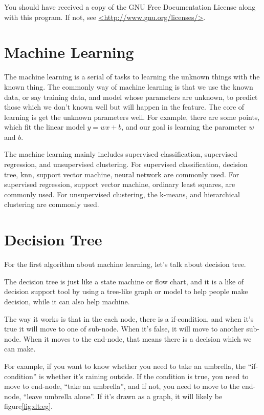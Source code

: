 \documentclass[twoside]{article}
\begin{document}
You should have received a copy of the GNU Free Documentation License
along with this program.  If not, see \href{http://www.gnu.org/licenses}{<http://www.gnu.org/licenses/>}.

\section{Machine Learning}
\label{sec:ml}

The machine learning is a serial of tasks to learning the unknown things with the known thing.
The commonly way of machine learning is that we use the known data, or say training data, and model whose parameters are unknown,
to predict those which we don't known well but will happen in the feature.  The core of learning is get the unknown parameters well.
For example, there are some points, which fit the linear model $y = wx+b$, and our goal is learning the parameter $w$ and $b$.

The machine learning mainly includes supervised classification, supervised regression, and unsupervised clustering.
For supervised classification, decision tree, knn, support vector machine, neural network are commonly used.
For supervised regression, support vector machine, ordinary least squares, are commonly used.
For unsupervised clustering, the k-means, and hierarchical clustering are commonly used.

\section{Decision Tree}
\label{sec:decisiontree}

For the first algorithm about machine learning, let's talk about decision tree.

The decision tree is just like a state machine or flow chart, and it is a like of decision support tool
by using a tree-like graph or model to help people make decision, while it can also help machine.

The way it works is that in the each node, there is a if-condition, and when it's true it will move to
one of sub-node. When it's false, it will move to another sub-node. When it moves to the end-node,
that means there is a decision which we can make.

For example, if you want to know whether you need to take an umbrella, the ``if-condition'' is
whether it's raining outside. If the condition is true, you need to move to end-node, ``take an umbrella'',
and if not, you need to move to the end-node, ``leave umbrella alone''.
If it's drawn as a graph, it will likely be figure\ref{fig:dt:eg}.
\end{document}
